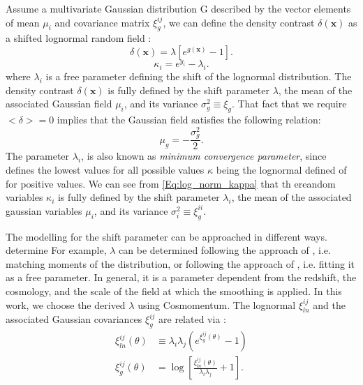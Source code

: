 \documentclass{aa}
\begin{document}
Assume a multivariate Gaussian distribution G described by the vector elements of mean $\mu_i$ and covariance matrix $\xi_g^{ij}$, we can define the density contrast $\delta(\bm{x})$ as a shifted lognormal random field :
\begin{equation}
    \delta(\bm{x})=\lambda[e^{g(\bm{x})}-1]. 
\end{equation}\label{Eq:log_norm_kappa}
\begin{equation}\label{Eq:log_norm_kappa}
    \kappa_{i}=e^{y_i}-\lambda_i. 
\end{equation}
where $\lambda_i$ is a free parameter defining the shift of the lognormal distribution.  The density contrast $\delta(\bm{x})$ is fully defined by the shift parameter $\lambda$, the mean of the associated Gaussian field $\mu_i$, and its variance $\sigma_g^2\equiv \xi_g$. That fact that we require $<\delta>=0$ implies that the Gaussian field satisfies the following relation:
\begin{equation}
    \mu_g=-\frac{\sigma_g^2}{2}.
\end{equation}
The parameter $\lambda_i$, is also known as \textit{minimum convergence
parameter}, since defines the lowest values for all possible values $\kappa$ being the lognormal defined of for positive values. We can see from \autoref{Eq:log_norm_kappa} that th ereandom variables $\kappa_i$ is fully defined by the shift parameter $\lambda_i$, the mean of the associated gaussian variables $\mu_i$, and its variance $\sigma_i^2\equiv \xi_g^{ii}$. 

 The modelling for the shift parameter can be approached in different ways.  determine
For example, $\lambda$ can be determined following the approach of \citet{xavier2016improving} , i.e.  matching moments of the distribution, or following the approach of \citet{hilbert2011cosmic}, i.e. fitting it as a free parameter. In general, it is a parameter dependent from the redshift, the cosmology, and the scale of the field at which the smoothing is applied.
In this work, we choose the derived $\lambda$ using Cosmomentum.
The lognormal $\xi^{ij}_{ln}$ and the associated Gaussian covariances $ \xi^{ij}_g$ are related via :
\begin{align}
    \xi^{ij}_{ln}(\theta) & \equiv \lambda_i \lambda_j (e^{ \xi^{ij}_g(\theta)}-1) \nonumber \\ 
    \xi^{ij}_g(\theta)&=\log{\left[ \frac{\xi^{ij}_{ln}(\theta)}{\lambda_i \lambda_j}+1\right ]}. \label{Eq:log_norm_corr}
\end{align}
\end{document}
